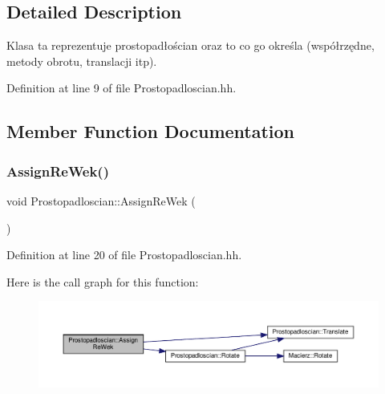 \subsection{Detailed Description}
Klasa ta reprezentuje prostopadłościan oraz to co go określa (współrzędne, metody obrotu, translacji itp). 

Definition at line 9 of file Prostopadloscian.\+hh.



\subsection{Member Function Documentation}
\mbox{\label{class_prostopadloscian_a98ee1de208d5a2ce4b40d88841498a66}} 
\subsubsection{\texorpdfstring{Assign\+Re\+Wek()}{AssignReWek()}}
{\footnotesize\ttfamily void Prostopadloscian\+::\+Assign\+Re\+Wek (\begin{DoxyParamCaption}{ }\end{DoxyParamCaption})\hspace{0.3cm}{\ttfamily [inline]}}



Definition at line 20 of file Prostopadloscian.\+hh.

Here is the call graph for this function\+:
\nopagebreak
\begin{figure}[H]
\begin{center}
\leavevmode
\includegraphics[width=350pt]{class_prostopadloscian_a98ee1de208d5a2ce4b40d88841498a66_cgraph}
\end{center}
\end{figure}
\mbox{\label{class_prostopadloscian_af2117035517518b659795c49948c8836}} 
